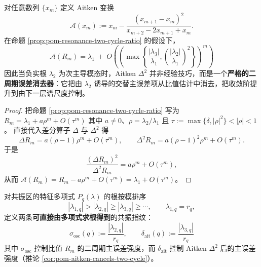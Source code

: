 \begin{corollary}\label{cor:pom-aitken-cancels-two-cycle}
对任意数列 \(\{x_m\}\) 定义 Aitken 变换
\[
\mathcal{A}(x_m):=x_m-\frac{(x_{m+1}-x_m)^2}{x_{m+2}-2x_{m+1}+x_m}.
\]
在命题 \ref{prop:pom-resonance-two-cycle-ratio} 的假设下，
\[
\boxed{\;
\mathcal{A}(R_m)=\lambda_1\ +\ O\!\left(\left(\max\!\left\{\frac{|\lambda_3|}{\lambda_1},\left(\frac{|\lambda_2|}{\lambda_1}\right)^2\right\}\right)^{m}\right)\;}
\]
因此当负实根 \(\lambda_2\) 为次主导模态时，Aitken \(\Delta^2\) 并非经验技巧，而是一个\textbf{严格的二周期误差消去器}：它把由 \(\lambda_2\) 诱导的交替主误差项从比值估计中消去，把收敛阶提升到由下一层谱尺度控制。
\end{corollary}
\begin{proof}
把命题 \ref{prop:pom-resonance-two-cycle-ratio} 写为
\(
R_m=\lambda_1+a\rho^{m}+O(\tau^{m})
\)
其中 \(a\neq 0\)、\(\rho=\lambda_2/\lambda_1\) 且
\(
\tau:=\max\{\delta,|\rho|^2\}<|\rho|<1
\)。
直接代入差分算子 \(\Delta\) 与 \(\Delta^2\) 得
\[
\Delta R_m=a(\rho-1)\rho^{m}+O(\tau^{m}),
\qquad
\Delta^2 R_m=a(\rho-1)^2\rho^{m}+O(\tau^{m}).
\]
于是
\[
\frac{(\Delta R_m)^2}{\Delta^2 R_m}
=a\rho^{m}+O(\tau^{m}),
\]
从而
\(
\mathcal{A}(R_m)=R_m-a\rho^{m}+O(\tau^{m})
=\lambda_1+O(\tau^{m})
\)。
\end{proof}

\begin{definition}\label{def:pom-resonance-aitken-fingerprints}
对共振区的特征多项式 \(P_q(\lambda)\) 的根按模排序
\[
|\lambda_{1,q}|>|\lambda_{2,q}|\ge|\lambda_{3,q}|\ge\cdots,
\qquad \lambda_{1,q}=r_q,
\]
定义两条\textbf{可直接由多项式求根得到}的共振指纹：
\[
\boxed{\;
\sigma_{\mathrm{osc}}(q):=\frac{|\lambda_{2,q}|}{r_q},
\qquad
\delta_{\mathrm{ait}}(q):=\frac{|\lambda_{3,q}|}{r_q}\;}
\]
其中 \(\sigma_{\mathrm{osc}}\) 控制比值 \(R_m\) 的二周期主误差强度，而 \(\delta_{\mathrm{ait}}\) 控制 Aitken \(\Delta^2\) 后的主误差强度（推论 \ref{cor:pom-aitken-cancels-two-cycle}）。
\end{definition}

